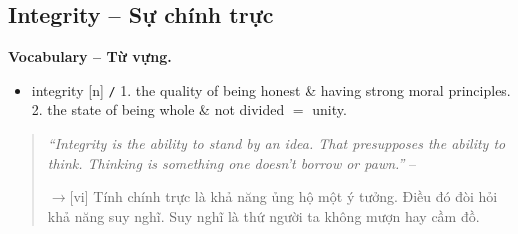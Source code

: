 \documentclass[12pt,twoside]{book}
\begin{document}
\subsection{Integrity -- Sự chính trực}
\textbf{\textsf{\small Vocabulary -- Từ vựng.}}
\begin{itemize}\small
	\item {\sf integrity} [n] {\tt/} 1. the quality of being honest \& having strong moral principles. 2. the state of being whole \& not divided $=$ {\sf unity}.
\end{itemize}

\begin{quotation}
	{\it``Integrity is the ability to stand by an idea. That presupposes the ability to think. Thinking is something one doesn't borrow or pawn.''} -- \cite{Rand_fountainhead}
	
	{\sf[en]$\to$[vi]} Tính chính trực là khả năng ủng hộ một ý tưởng. Điều đó đòi hỏi khả năng suy nghĩ. Suy nghĩ là thứ người ta không mượn hay cầm đồ.
\end{quotation}
\end{document}
